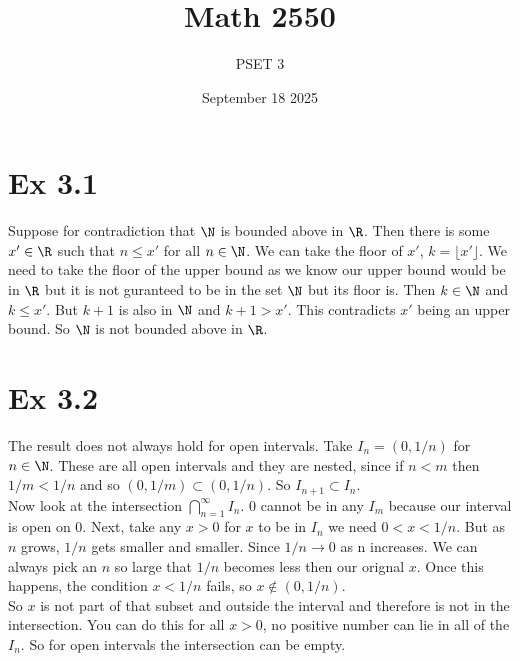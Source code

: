 \documentclass{report}
\title{\Huge{Math 2550}}
\author{\huge{PSET 3}}
\date{September 18 2025}
\begin{document}
\maketitle
\newpage%
\tableofcontents
\pagebreak

\section*{Ex 3.1}

\begin{proofWithHibiscus}
  Suppose for contradiction that $\N$ is bounded above in $\R$. Then there is some $x' \in \R$ such that 
  $n \leq x'$ for all $n \in \N$. We can take the floor of $x'$, $k = \lfloor x' \rfloor$. We need to take the floor of the upper bound 
  as we know our upper bound would be in $\R$ but it is not guranteed to be in the set $\N$ but its floor is. Then $k \in \N$ and $k \leq x'$. 
  But $k+1$ is also in $\N$ and $k+1 > x'$. This contradicts $x'$ being an upper bound. 
  So $\N$ is not bounded above in $\R$.
\end{proofWithHibiscus}




\section*{Ex 3.2}


\begin{proofWithHibiscus}
  The result does not always hold for open intervals. 
  Take $I_n = (0,1/n)$ for $n \in \N$. 
  These are all open intervals and they are nested, since if $n<m$ then $1/m < 1/n$ and so $(0,1/m) \subset (0,1/n)$. 
  So $I_{n+1} \subset I_n$. \\

  Now look at the intersection $\bigcap_{n=1}^\infty I_n$. 0 cannot be in any $I_m$ because our interval is open on 0.
  Next, take any $x>0$ for $x$ to be in $I_n$ we need $0 < x < 1/n$. 
  But as $n$ grows, $1/n$ gets smaller and smaller. 
  Since $1/n \to 0$ as n increases. We can always pick an $n$ so large that $1/n$ becomes less then our orignal $x$. 
  Once this happens, the condition $x < 1/n$ fails, so $x \notin (0,1/n)$. \\
  So $x$ is not part of that subset and outside the interval and therefore is not in the intersection. 
  You can do this for all $x>0$, no positive number can lie in all of the $I_n$. 
  So for open intervals the intersection can be empty.
\end{proofWithHibiscus}
\end{document}
